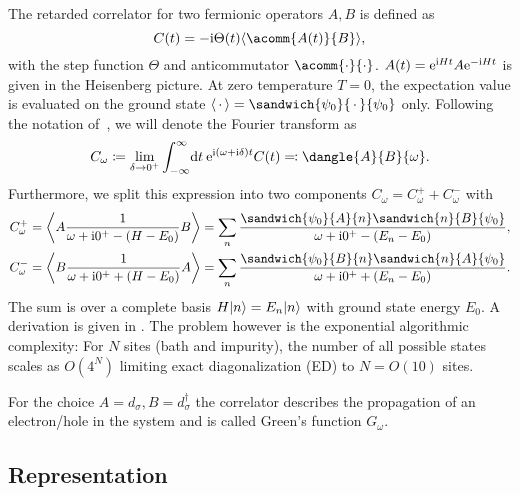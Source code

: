 The retarded correlator for two fermionic operators $A, B$ is defined as
\begin{equation}
    C(t) = -\mi \Theta(t) \expval{\acomm{A(t)}{B}},
    \label{eq:correlator-time}
\end{equation}
with the step function $\Theta$ and anticommutator $\acomm{\cdot}{\cdot}$.
$A(t) = \mathrm{e}^{\mathrm{i} H t} A \mathrm{e}^{-\mathrm{i} H t}$ is given in the Heisenberg picture.
At zero temperature $T=0$, the expectation value is evaluated on the ground state
$\expval{\,\cdot\,} = \sandwich{\psi_0}{\,\cdot\,}{\psi_0}$ only.
Following the notation of~\cite{Bulla1998,Kugler2022},
we will denote the Fourier transform as
\begin{equation}
    C_\omega
    \coloneq
    \lim_{\delta\to0^+}
    \int_{-\infty}^\infty\! \md t\> \me^{\mi (\omega + \mi\delta) t} C(t)
    \eqcolon
    \dangle{A}{B}{\omega}.
\end{equation}
Furthermore,
we split this expression into two components $C_\omega = C^+_\omega + C^-_\omega$ with
\begin{subequations}
    \begin{align}
        C^+_\omega
         & =
        \expval*{A \frac{1}{\omega + \mi0^+ - (H - E_0)} B}
        =
        \sum_n \frac{\sandwich{\psi_0}{A}{n}\sandwich{n}{B}{\psi_0}}{\omega + \mi0^+ - (E_n - E_0)}, \\
        C^-_\omega
         & =
        \expval*{B \frac{1}{\omega + \mi0^+ + (H - E_0)} A}
        =
        \sum_n \frac{\sandwich{\psi_0}{B}{n}\sandwich{n}{A}{\psi_0}}{\omega + \mi0^+ + (E_n - E_0)}.
    \end{align}
    \label{eq:correlator-frequency}
\end{subequations}
The sum is over a complete basis $H\lvert n\rangle = E_n\lvert n\rangle$ with ground state energy $E_0$.
A derivation is given in .
The problem however is the exponential algorithmic complexity:
For $N$ sites (bath and impurity), the number of all possible states scales as $O(4^N)$
limiting exact diagonalization (ED) to $N=O(10)$ sites.

For the choice $A=d_\sigma, B=d_\sigma^\dag$ the correlator describes
the propagation of an electron/hole in the system and is called Green's function $G_\omega$.

\subsection{Representation}

